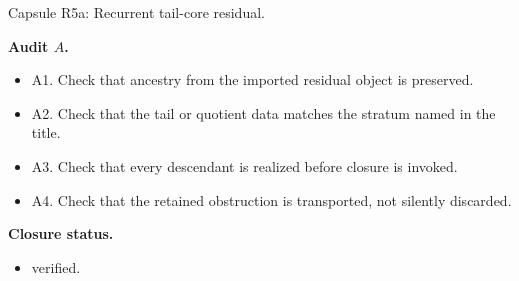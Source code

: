 \documentclass[11pt]{amsart}
\newcommand{\capsulefield}[1]{\par\smallskip\noindent\textbf{#1.}\ }
\begin{document}
\begin{proofcapsule}{Capsule R5a: Recurrent tail-core residual.}
  \capsulefield{Audit \(A\)}
  \begin{itemize}[leftmargin=1.8em]
  \item A1. Check that ancestry from the imported residual object is preserved.
  \item A2. Check that the tail or quotient data matches the stratum named in the title.
  \item A3. Check that every descendant is realized before closure is invoked.
  \item A4. Check that the retained obstruction is transported, not silently discarded.
  \end{itemize}
  \capsulefield{Closure status}
  \begin{itemize}[leftmargin=1.8em]
  \item verified.
  \end{itemize}
\end{proofcapsule}
\end{document}
